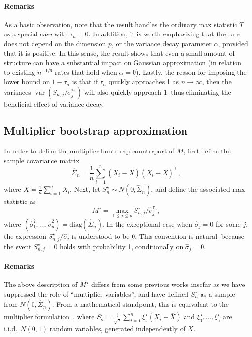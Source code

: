 \documentclass[aos,preprint]{imsart}
\numberwithin{equation}{section}
\theoremstyle{plain}
\renewcommand{\hat}[1]{\widehat{#1}}
\newcommand{\var}{\operatorname{var}}
\newcommand{\ttop}{^{\top}}
\newcommand{\1}{{\bf{1}}}
\newcommand{\0}{\mathbf{0}}
\begin{document}
\paragraph{Remarks} As a basic observation, note that the result handles the ordinary max statistic $T$ as a special case with $\tau_n=0$. In addition, it is worth emphasizing that the rate does not depend on the dimension $p$, or the variance decay parameter $\alpha$, provided that it is positive. In this sense, the result shows that even a small amount of structure can have a substantial impact on Gaussian approximation (in relation to existing $n^{-1/6}$ rates that hold when $\alpha=0$). Lastly, the reason for imposing the lower bound on $1-\tau_n$ is that if $\tau_n$  quickly  approaches 1 as $n\to\infty$, then the variances $\var(S_{n,j}/\sigma_j^{\tau_n})$ will also quickly approach 1, thus eliminating the beneficial effect of variance decay. 


\subsection{Multiplier bootstrap approximation}\label{sec:MB}

In order to define the multiplier bootstrap counterpart of $\tilde M$, first define the sample covariance matrix 
\begin{equation}\label{eqn:sighat}
\hat\Sigma_n=\frac{1}{n}\sum_{i=1}^n(X_i-\bar X)(X_i-\bar X)\ttop,
\end{equation}
where $\bar X=\frac 1n \sum_{i=1}^n X_i$. Next, let $S_n^{\star}\sim N(0,\hat\Sigma_n)$,
and define the associated max statistic as
\begin{equation}\label{eqn:Mstardef}
M^{\star}=\max_{1\leq j\leq p}S_{n,j}^{\star}/\hat\sigma_j^{\tau_n},
\end{equation}
where $(\hat\sigma_1^2,\dots,\hat\sigma_p^2)=\text{diag}(\hat\Sigma_n)$. 
In the exceptional case when $\hat\sigma_j=0$ for some $j$, the expression $S_{n,j}^{\star}/\hat\sigma_j$ is understood to be 0. This convention is natural, because the event $S_{n,j}^{\star}=0$ holds with probability 1, conditionally on $\hat\sigma_j=0$.

\paragraph{Remarks} 
The above description of $M^{\star}$ differs from some previous works insofar as we have suppressed the role of ``multiplier variables'', and have defined $S_n^{\star}$ as a sample from $N(0,\hat\Sigma_n)$. From a mathematical standpoint, this is equivalent to the multiplier formulation~\citep{CCK:2013}, where $S_n^{\star}= \frac{1}{\sqrt n}\sum_{i=1}^n \xi_i^{\star}(X_i-\bar X)$ and $\xi_1^{\star},\dots,\xi_n^{\star}$ are i.i.d.~$N(0,1)$ random variables, generated independently of $X$.
\end{document}
